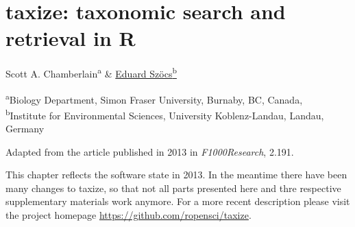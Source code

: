 
\chapter{taxize: taxonomic search and retrieval in R}
\label{sec:taxize} 
 
\begin{sloppypar}

\bigskip
Scott A. Chamberlain\textsuperscript{a} \& \underline{Eduard Szöcs\textsuperscript{b}}

\bigskip
\small
\noindent 
\textsuperscript{a}Biology Department, Simon Fraser University, Burnaby, BC, Canada,\\
\textsuperscript{b}Institute for Environmental Sciences, University Koblenz-Landau, Landau, Germany 

\bigskip 
\normalsize
\noindent 
Adapted from the article published in 2013 in \emph{F1000Research}, 2.191.

\bigskip
\noindent
This chapter reflects the software state in 2013.
In the meantime there have been many changes to taxize, so that not all parts presented here and thre respective supplementary materials work anymore. 
For a more recent description please visit the project homepage \url{https://github.com/ropensci/taxize}.

\end{sloppypar}

\newpage


